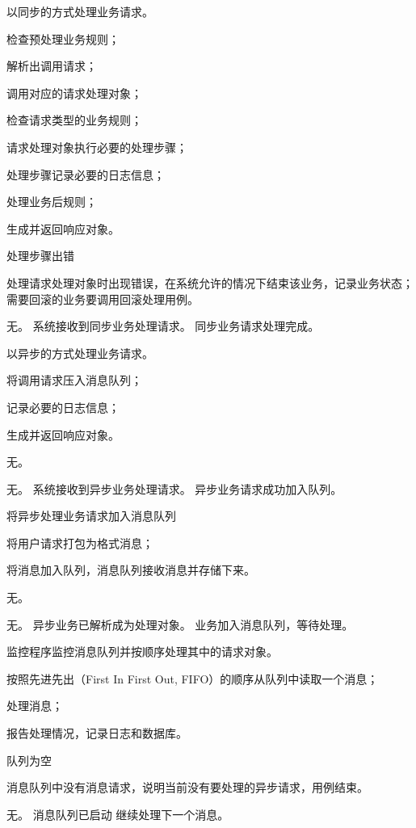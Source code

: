 \documentclass[cs4size,a4paper,nofonts]{ctexart}
\begin{document}
{以同步的方式处理业务请求。} %
{} %
{
\item 检查预处理业务规则；
\item 解析出调用请求；
\item 调用对应的请求处理对象；
\item 检查请求类型的业务规则；
\item 请求处理对象执行必要的处理步骤；
\item 处理步骤记录必要的日志信息；
\item 处理业务后规则；
\item 生成并返回响应对象。
} %
{} %
{
\item 处理步骤出错\par
处理请求处理对象时出现错误，在系统允许的情况下结束该业务，记录业务状态；需要回滚的业务要调用回滚处理用例。
} %
{无。} %
{系统接收到同步业务处理请求。} %
{同步业务请求处理完成。} %

{以异步的方式处理业务请求。} %
{} %
{
\item 将调用请求压入消息队列；
\item 记录必要的日志信息；
\item 生成并返回响应对象。
} %
{} %
{
\item 无。
} %
{无。} %
{系统接收到异步业务处理请求。} %
{异步业务请求成功加入队列。} %

{将异步处理业务请求加入消息队列} %
{} %
{
\item 将用户请求打包为格式消息；
\item 将消息加入队列，消息队列接收消息并存储下来。
} %
{} %
{
\item 无。
} %
{无。} %
{异步业务已解析成为处理对象。} %
{业务加入消息队列，等待处理。} %

{监控程序监控消息队列并按顺序处理其中的请求对象。} %
{} %
{
\item 按照先进先出（First In First Out, FIFO）的顺序从队列中读取一个消息；
\item 处理消息；
\item 报告处理情况，记录日志和数据库。
} %
{} %
{
\item 队列为空\par
消息队列中没有消息请求，说明当前没有要处理的异步请求，用例结束。
} %
{无。} %
{消息队列已启动} %
{继续处理下一个消息。} %
\end{document}
